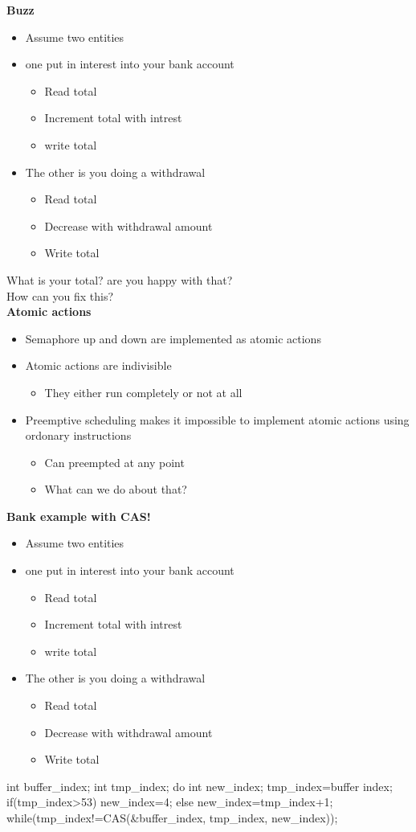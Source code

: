 \textbf{Buzz}
\begin{itemize}
\item Assume two entities
\item one put in interest into your bank account
\begin{itemize}
\item Read total
\item Increment total with intrest
\item write total
\end{itemize}
\item The other is you doing a withdrawal
\begin{itemize}
\item Read total
\item Decrease with withdrawal amount
\item Write total
\end{itemize}
\end{itemize}
What is your total? are you happy with that?\\
How can you fix this?\\
\textbf{Atomic actions}
\begin{itemize}
\item Semaphore up and down are implemented as atomic actions
\item Atomic actions are indivisible
\begin{itemize}
\item They either run completely or not at all
\end{itemize}
\item Preemptive scheduling makes it impossible to implement atomic actions using ordonary instructions
\begin{itemize}
\item Can preempted at any point
\item What can we do about that?
\end{itemize}
\end{itemize}
\textbf{Bank example with CAS!}
\begin{itemize}
\item Assume two entities
\item one put in interest into your bank account
\begin{itemize}
\item Read total
\item Increment total with intrest
\item write total
\end{itemize}
\item The other is you doing a withdrawal
\begin{itemize}
\item Read total
\item Decrease with withdrawal amount
\item Write total
\end{itemize}
\end{itemize}
\begin{cpp}
int buffer_index;
int tmp_index;
do {
int new_index;
tmp_index=buffer index;
if(tmp_index>53)
 new_index=4;
else
 new_index=tmp_index+1;
 } while(tmp_index!=CAS(&buffer_index, tmp_index, new_index));
\end{cpp}